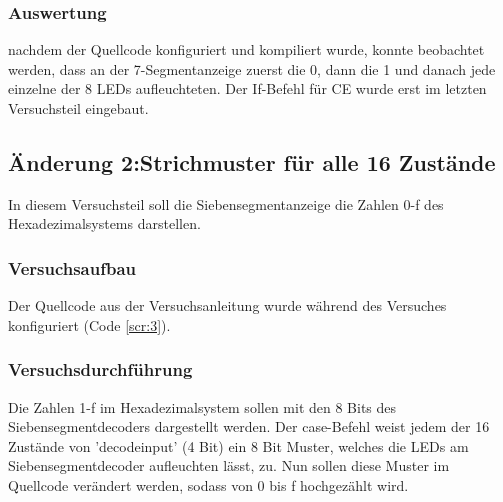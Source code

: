 \documentclass[12pt,a4paper]{article}
\begin{document}
\subsubsection*{Auswertung}
nachdem der Quellcode konfiguriert und kompiliert wurde, konnte beobachtet werden, dass an der 7-Segmentanzeige zuerst die 0, dann die 1 und danach jede einzelne der 8 LEDs aufleuchteten. Der If-Befehl für CE wurde erst im letzten Versuchsteil eingebaut.
\subsection{Änderung 2:Strichmuster für alle 16 Zustände}
In diesem Versuchsteil soll die Siebensegmentanzeige die Zahlen 0-f des Hexadezimalsystems darstellen.
\subsubsection*{Versuchsaufbau}
Der Quellcode aus der Versuchsanleitung wurde während des Versuches konfiguriert (Code \ref{scr:3}).
\subsubsection*{Versuchsdurchführung}
Die Zahlen 1-f im Hexadezimalsystem sollen mit den 8 Bits des Siebensegmentdecoders dargestellt werden. Der case-Befehl weist jedem der 16 Zustände von 'decodeinput' (4 Bit) ein 8 Bit Muster, welches die LEDs am Siebensegmentdecoder aufleuchten lässt, zu. Nun sollen diese Muster im Quellcode verändert werden, sodass von 0 bis f hochgezählt wird.
\end{document}
